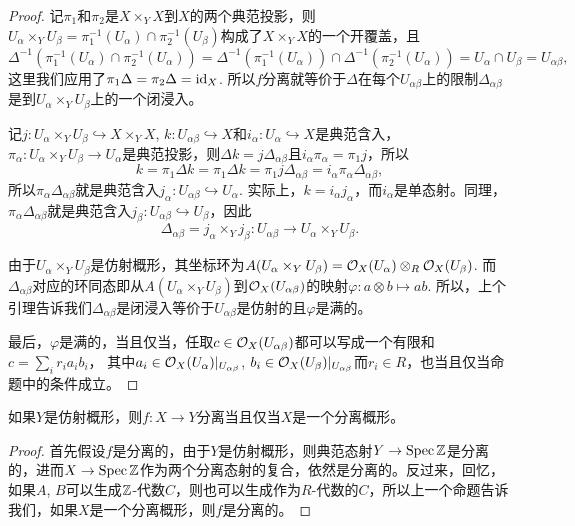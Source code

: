 \begin{proof}
记$\pi_1$和$\pi_2$是$X\times_Y X$到$X$的两个典范投影，则$U_\alpha\times_Y U_\beta=\pi_1^{-1}(U_\alpha)\cap\pi_2^{-1}(U_\beta)$构成了$X\times_Y X$的一个开覆盖，且
\[
	\Delta^{-1}\left(\pi_1^{-1}(U_\alpha)\cap\pi_2^{-1}(U_\alpha)\right)=\Delta^{-1}\left(\pi_1^{-1}(U_\alpha)\right)\cap\Delta^{-1}\left(\pi_2^{-1}(U_\alpha)\right)=U_\alpha\cap U_\beta=U_{\alpha\beta},
\]
这里我们应用了$\pi_1\Delta=\pi_2\Delta=\operatorname{id}_X$. 
所以$f$分离就等价于$\Delta$在每个$U_{\alpha\beta}$上的限制$\Delta_{\alpha\beta}$是到$U_\alpha\times_Y U_\beta$上的一个闭浸入。

记$j:U_\alpha\times_Y U_\beta\hookrightarrow X \times_Y X$, $k:U_{\alpha\beta}\hookrightarrow X$和$i_\alpha:U_\alpha\hookrightarrow X$是典范含入，$\pi_\alpha:U_\alpha\times_Y U_\beta\to U_\alpha$是典范投影，则$\Delta k=j\Delta_{\alpha\beta}$且$i_\alpha\pi_\alpha=\pi_1j$，所以
\[
	k=\pi_1\Delta k=\pi_1\Delta k=\pi_1j\Delta_{\alpha\beta}=i_\alpha\pi_\alpha\Delta_{\alpha\beta},
\]
所以$\pi_\alpha\Delta_{\alpha\beta}$就是典范含入$j_\alpha:U_{\alpha\beta}\hookrightarrow U_\alpha$. 实际上，$k=i_\alpha j_\alpha$，而$i_\alpha$是单态射。同理，$\pi_\alpha\Delta_{\alpha\beta}$就是典范含入$j_\beta:U_{\alpha\beta}\hookrightarrow U_\beta$，因此
\[
	\Delta_{\alpha\beta}=j_\alpha\times_Y j_\beta:U_{\alpha\beta}\to U_\alpha\times_Y U_\beta.
\]

由于$U_\alpha\times_Y U_\beta$是仿射概形，其坐标环为$A(U_\alpha\times_Y U_\beta)=\mathcal{O}_X(U_\alpha)\otimes_{R}\mathcal{O}_X(U_\beta)$.
而$\Delta_{\alpha\beta}$对应的环同态即从$A(U_\alpha\times_Y U_\beta)$到$\mathcal{O}_X(U_{\alpha\beta})$的映射$\varphi:a\otimes b\mapsto ab$. 
所以，上个引理告诉我们$\Delta_{\alpha\beta}$是闭浸入等价于$U_{\alpha\beta}$是仿射的且$\varphi$是满的。

最后，$\varphi$是满的，当且仅当，任取$c\in \mathcal{O}_X(U_{\alpha\beta})$都可以写成一个有限和$c=\sum_{i}r_ia_ib_i$，
其中$a_i\in \mathcal{O}_X(U_\alpha)|_{U_{\alpha\beta}}$, $b_i\in \mathcal{O}_X(U_\beta)|_{U_{\alpha\beta}}$而$r_i\in R$，也当且仅当命题中的条件成立。
\end{proof}

\begin{coro}
如果$Y$是仿射概形，则$f:X\to Y$分离当且仅当$X$是一个分离概形。
\end{coro}

\begin{proof}
首先假设$f$是分离的，由于$Y$是仿射概形，则典范态射$Y\to \operatorname{Spec} \mathbb{Z}$是分离的，进而$X\to\operatorname{Spec} \mathbb{Z}$作为两个分离态射的复合，依然是分离的。反过来，回忆，如果$A$, $B$可以生成$\mathbb{Z}$-代数$C$，则也可以生成作为$R$-代数的$C$，所以上一个命题告诉我们，如果$X$是一个分离概形，则$f$是分离的。
\end{proof}


